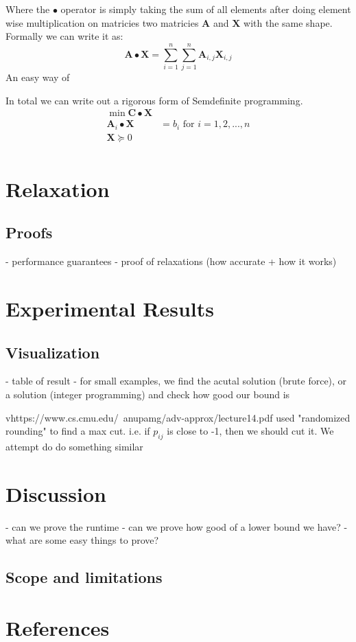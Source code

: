 \documentclass{article}
\begin{document}
Where the \( \bullet \) operator is simply taking the sum of all elements after doing element wise multiplication on matricies two matricies \( \mathbf{A} \) and \( \mathbf{X} \) with the same shape. Formally we can write it as:
\[
  \mathbf{A} \bullet \mathbf{X} = \sum_{i = 1}^n \sum_{j = 1}^n \mathbf{A}_{i, j} \mathbf{X}_{i, j}
\]
An easy way of

In total we  can write out a rigorous form of Semdefinite programming.
\begin{align*}
  \min \mathbf{C} \bullet \mathbf{X} \\
  \mathbf{A}_i \bullet \mathbf{X} &= b_i  \text{   for } i = 1, 2, ..., n\\
  \mathbf{X} \succeq 0 \\
\end{align*}


\section{Relaxation}
\subsection{Proofs}
- performance guarantees
- proof of relaxations (how accurate + how it works)


\section{Experimental Results}
\subsection{Visualization}
- table of result
- for small examples, we find the acutal solution (brute force), or a solution (integer programming) and check how 
good our bound is

vhttps://www.cs.cmu.edu/~anupamg/adv-approx/lecture14.pdf used "randomized rounding" to find a max cut.
i.e. if $p_{ij}$ is close to -1, then we should cut it. We attempt do do something similar

\section{Discussion}


- can we prove the runtime
- can we prove how good of a lower bound we have?
- what are some easy things to prove?

\subsection{Scope and limitations}

\section{References}
\end{document}
